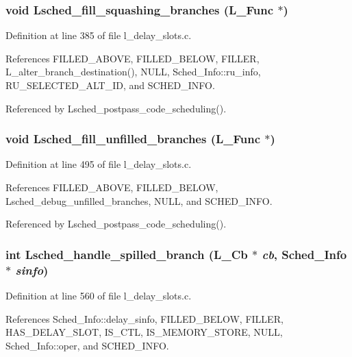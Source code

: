 \subsubsection{\setlength{\rightskip}{0pt plus 5cm}void Lsched\_\-fill\_\-squashing\_\-branches (L\_\-Func $\ast$)}\label{l__schedule_8h_2ffaa8687f357a681524ecd46a1f1e50}




Definition at line 385 of file l\_\-delay\_\-slots.c.

References FILLED\_\-ABOVE, FILLED\_\-BELOW, FILLER, L\_\-alter\_\-branch\_\-destination(), NULL, Sched\_\-Info::ru\_\-info, RU\_\-SELECTED\_\-ALT\_\-ID, and SCHED\_\-INFO.

Referenced by Lsched\_\-postpass\_\-code\_\-scheduling().
\subsubsection{\setlength{\rightskip}{0pt plus 5cm}void Lsched\_\-fill\_\-unfilled\_\-branches (L\_\-Func $\ast$)}\label{l__schedule_8h_4693926197cdc3090fa3c5cf9de34cb5}




Definition at line 495 of file l\_\-delay\_\-slots.c.

References FILLED\_\-ABOVE, FILLED\_\-BELOW, Lsched\_\-debug\_\-unfilled\_\-branches, NULL, and SCHED\_\-INFO.

Referenced by Lsched\_\-postpass\_\-code\_\-scheduling().
\subsubsection{\setlength{\rightskip}{0pt plus 5cm}int Lsched\_\-handle\_\-spilled\_\-branch (L\_\-Cb $\ast$ {\em cb}, \bf{Sched\_\-Info} $\ast$ {\em sinfo})}\label{l__schedule_8h_6de719e078b25892d78ade0a72a72e1f}




Definition at line 560 of file l\_\-delay\_\-slots.c.

References Sched\_\-Info::delay\_\-sinfo, FILLED\_\-BELOW, FILLER, HAS\_\-DELAY\_\-SLOT, IS\_\-CTL, IS\_\-MEMORY\_\-STORE, NULL, Sched\_\-Info::oper, and SCHED\_\-INFO.

